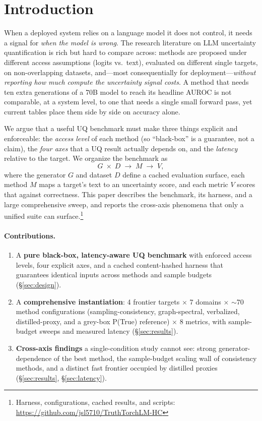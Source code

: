 \documentclass[11pt]{article}
\begin{document}
\section{Introduction}
When a deployed system relies on a language model it does not control, it needs a signal
for \emph{when the model is wrong}. The research literature on LLM uncertainty
quantification is rich but hard to compare across: methods are proposed under different
access assumptions (logits vs.\ text), evaluated on different single targets, on
non-overlapping datasets, and---most consequentially for deployment---\emph{without
reporting how much compute the uncertainty signal costs}. A method that needs ten extra
generations of a 70B model to reach its headline AUROC is not comparable, at a system
level, to one that needs a single small forward pass, yet current tables place them side
by side on accuracy alone.

We argue that a useful UQ benchmark must make three things explicit and enforceable:
the \emph{access level} of each method (so ``black-box'' is a guarantee, not a claim),
the \emph{four axes} that a UQ result actually depends on, and the \emph{latency}
relative to the target. We organize the benchmark as
\[
  G \;\times\; D \;\longrightarrow\; M \;\longrightarrow\; V,
\]
where the generator $G$ and dataset $D$ define a cached evaluation surface, each method
$M$ maps a target's text to an uncertainty score, and each metric $V$ scores that against
correctness. This paper describes the benchmark, its harness, and a large comprehensive
sweep, and reports the cross-axis phenomena that only a unified suite can
surface.\footnote{Harness, configurations, cached results, and scripts:
\url{https://github.com/jsl5710/TruthTorchLM-HC}}

\paragraph{Contributions.}
\begin{enumerate}[leftmargin=1.4em,itemsep=1pt,topsep=2pt]
\item A \textbf{pure black-box, latency-aware UQ benchmark} with enforced access levels,
four explicit axes, and a cached content-hashed harness that guarantees identical inputs
across methods and sample budgets (\S\ref{sec:design}).
\item A \textbf{comprehensive instantiation}: 4 frontier targets $\times$ 7 domains
$\times$ $\sim$70 method configurations (sampling-consistency, graph-spectral, verbalized,
distilled-proxy, and a grey-box P(True) reference) $\times$ 8 metrics, with sample-budget
sweeps and measured latency (\S\ref{sec:results}).
\item \textbf{Cross-axis findings} a single-condition study cannot see: strong
generator-dependence of the best method, the sample-budget scaling wall of
consistency methods, and a distinct fast frontier occupied by distilled proxies
(\S\ref{sec:results}, \S\ref{sec:latency}).
\end{enumerate}
\end{document}
